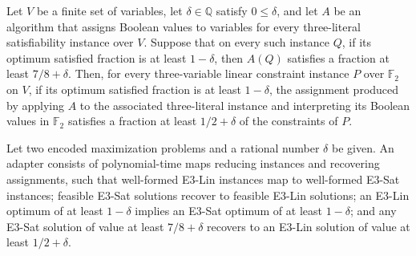 \begin{theorem}
\label{FABL.e3LinAlgorithmOfE3Sat_isApproximation}
\leanok
{}
Let $V$ be a finite set of variables, let $\delta\in\mathbb{Q}$ satisfy $0\leq\delta$,
and let $A$ be an algorithm that assigns Boolean values to variables for every
three-literal satisfiability instance over $V$. Suppose that on every such instance $Q$,
if its optimum satisfied fraction is at least $1-\delta$, then $A(Q)$ satisfies a
fraction at least $7/8+\delta$. Then, for every three-variable linear constraint
instance $P$ over $\mathbb{F}_2$ on $V$, if its optimum satisfied fraction is at least
$1-\delta$, the assignment produced by applying $A$ to the associated three-literal
instance and interpreting its Boolean values in $\mathbb{F}_2$ satisfies a fraction at
least $1/2+\delta$ of the constraints of $P$.
\end{theorem}

\begin{definition}
\label{FABL.E3LinE3SatPolytimeAdapter}
\leanok
{}
Let two encoded maximization problems and a rational number $\delta$ be given. An
adapter consists of polynomial-time maps reducing instances and recovering assignments,
such that well-formed E3-Lin instances map to well-formed E3-Sat instances; feasible
E3-Sat solutions recover to feasible E3-Lin solutions; an E3-Lin optimum of at least
$1-\delta$ implies an E3-Sat optimum of at least $1-\delta$; and any E3-Sat solution of
value at least $7/8+\delta$ recovers to an E3-Lin solution of value at least
$1/2+\delta$.
\end{definition}

